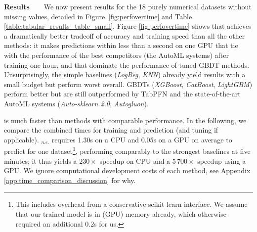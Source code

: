 \documentclass{article}
\newcommand{\slimparagraph}[1]{\textbf{#1~~~}}
\begin{document}
\slimparagraph{Results}
We now present results for the 18 purely numerical datasets without missing values, detailed in Figure~\ref{fig:perfovertime} and Table \ref{table:tabular_results_table_small}. 
%
Figure \ref{fig:perfovertime} shows that \methodname{} achieves a dramatically better tradeoff of accuracy and training speed than all the other methods: it makes predictions within less than a second on one GPU that tie with the performance of the best competitors (the AutoML systems) after training one hour, and that dominate the performance of tuned GBDT methods.
Unsurprisingly, the simple baselines (\textit{LogReg}, \textit{KNN}) already yield results with a small budget but perform worst overall.
GBDTs (\textit{XGBoost}, \textit{CatBoost}, \textit{LightGBM}) perform better but are still outperformed by TabPFN and the state-of-the-art AutoML systems (\textit{Auto-sklearn 2.0}, \textit{Autogluon}).

\methodname{} is much faster than methods with comparable performance.
In the following, we compare the combined times for training and prediction (and tuning if applicable).
\methodname{}$_{n.e.}$ requires 1.30s on a CPU and 0.05s on a GPU on average to predict for one dataset\footnote{This includes overhead from a conservative scikit-learn interface. We assume that our trained model is in (GPU) memory already, which otherwise required an additional 0.2s for us.}, performing comparably to the strongest baselines at five minutes; it thus yields a $230\times$ speedup on CPU and a $5\,700\times$ speedup using a GPU.
We ignore computational development costs of each method, see Appendix \ref{app:time_comparison_discussion} for why.
\end{document}

